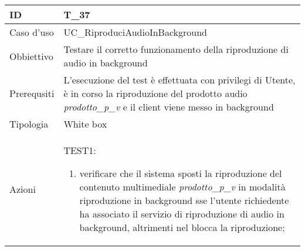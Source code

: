 \begin{table}[hb]
    \centering
    \begin{tabular}{ |p{2cm}|p{10cm}|  }
        \hline
        ID          & T\_37                                                                                                                                                                  \\\hline
        Caso d'uso  & UC\_RiproduciAudioInBackground                                                                                                                                         \\\hline
        Obbiettivo  & Testare il corretto funzionamento della riproduzione di audio in background                                                                                            \\\hline
        Prerequsiti & L'esecuzione del test è effettuata con privilegi di Utente, è in corso la riproduzione del prodotto audio \emph{prodotto\_p\_v} e il client viene messo in background \\\hline
        Tipologia   & White box                                                                                                                                                              \\\hline
        Azioni      &
        TEST1:
        \begin{enumerate}[nosep, topsep=0pt]
            \item verificare che il sistema sposti la riproduzione del contenuto multimediale \emph{prodotto\_p\_v} in modalità riproduzione in background sse l'utente richiedente ha associato il servizio di riproduzione di audio in background, altrimenti nel blocca la riproduzione;
        \end{enumerate}
        \\\hline
    \end{tabular}
\end{table}

